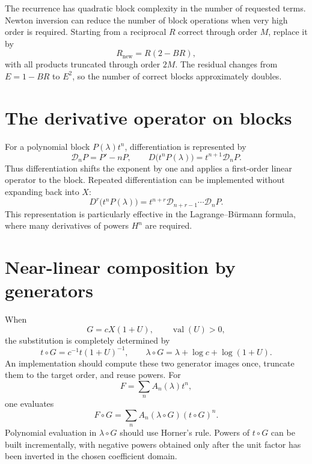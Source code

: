 \documentclass[11pt,openany]{book}
\theoremstyle{definition}
\theoremstyle{plain}
\theoremstyle{remark}
\DeclareMathOperator{\val}{val}
\begin{document}
The recurrence has quadratic block complexity in the number of requested terms. Newton inversion can reduce the number of block operations when very high order is required. Starting from a reciprocal \(R\) correct through order \(M\), replace it by
\begin{equation}\label{eq:newton-reciprocal-implementation}
 R_{\mathrm{new}}=R(2-BR),
\end{equation}
with all products truncated through order \(2M\). The residual changes from \(E=1-BR\) to \(E^2\), so the number of correct blocks approximately doubles.


\section{The derivative operator on blocks}
For a polynomial block \(P(\lambda)t^n\), differentiation is represented by
\[
 \mathcal D_nP=P'-nP,
 \qquad
 D\bigl(t^nP(\lambda)\bigr)=t^{n+1}\mathcal D_nP.
\]
Thus differentiation shifts the exponent by one and applies a first-order linear operator to the block. Repeated differentiation can be implemented without expanding back into \(X\):
\begin{equation}\label{eq:iterated-block-operator}
 D^r\bigl(t^nP(\lambda)\bigr)
 =t^{n+r}\mathcal D_{n+r-1}\cdots\mathcal D_nP.
\end{equation}
This representation is particularly effective in the Lagrange--B\"urmann formula, where many derivatives of powers \(H^n\) are required.

\section{Near-linear composition by generators}
When
\[
 G=cX(1+U),\qquad \val(U)>0,
\]
the substitution is completely determined by
\begin{equation}\label{eq:implementation-generators}
 t\circ G=c^{-1}t(1+U)^{-1},
 \qquad
 \lambda\circ G=\lambda+\log c+\log(1+U).
\end{equation}
An implementation should compute these two generator images once, truncate them to the target order, and reuse powers. For
\[
 F=\sum_n A_n(\lambda)t^n,
\]
one evaluates
\begin{equation}\label{eq:composition-generator-eval}
 F\circ G
 =\sum_n A_n(\lambda\circ G)(t\circ G)^n.
\end{equation}
Polynomial evaluation in \(\lambda\circ G\) should use Horner's rule. Powers of \(t\circ G\) can be built incrementally, with negative powers obtained only after the unit factor has been inverted in the chosen coefficient domain.
\end{document}
